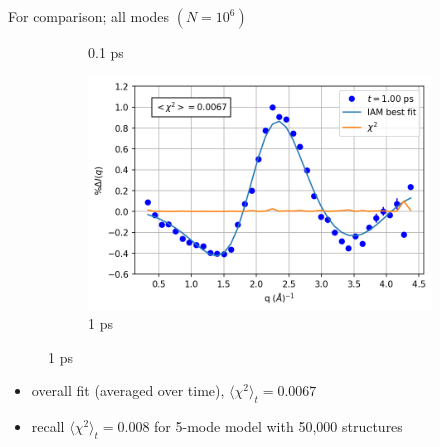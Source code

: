 \documentclass{beamer}
\newcommand\w{0.32}
\begin{document}
\begin{frame}{For comparison; all modes $(N= 10^6)$}
\begin{figure}
\begin{subfigure}[b]{\w\textwidth}
			\caption{0.1 ps}
		\end{subfigure}
		\begin{subfigure}[b]{\w\textwidth}
			\centering
			\includegraphics[width=\textwidth]{figures/1000000_allmodes_1.00.png}
			\caption{1 ps}
		\end{subfigure}
	\end{figure}
	\begin{itemize}
		\item overall fit (averaged over time), $\langle\chi^2\rangle_t = 0.0067$
		\item recall $\langle\chi^2\rangle_t = 0.008$ for 5-mode model with 50,000 structures
	\end{itemize}
\end{frame}
\end{document}
